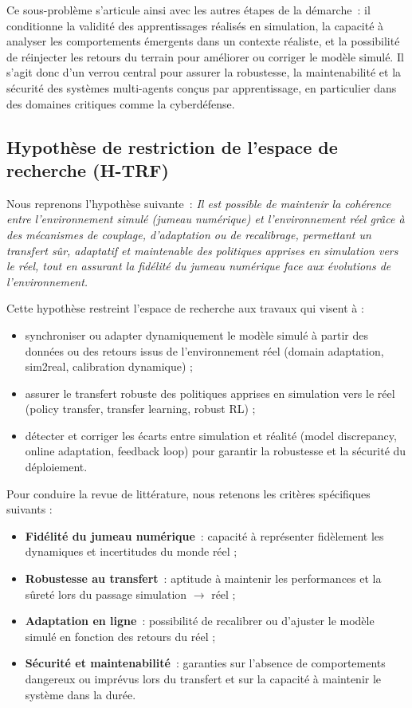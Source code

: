 Ce sous-problème s'articule ainsi avec les autres étapes de la démarche : il conditionne la validité des apprentissages réalisés en simulation, la capacité à analyser les comportements émergents dans un contexte réaliste, et la possibilité de réinjecter les retours du terrain pour améliorer ou corriger le modèle simulé. Il s'agit donc d'un verrou central pour assurer la robustesse, la maintenabilité et la sécurité des systèmes multi-agents conçus par apprentissage, en particulier dans des domaines critiques comme la cyberdéfense.

\subsection*{Hypothèse de restriction de l’espace de recherche (H-TRF)}

Nous reprenons l’hypothèse suivante~: \textit{Il est possible de maintenir la cohérence entre l’environnement simulé (jumeau numérique) et l’environnement réel grâce à des mécanismes de couplage, d’adaptation ou de recalibrage, permettant un transfert sûr, adaptatif et maintenable des politiques apprises en simulation vers le réel, tout en assurant la fidélité du jumeau numérique face aux évolutions de l’environnement.}

Cette hypothèse restreint l’espace de recherche aux travaux qui visent à :
\begin{itemize}
  \item synchroniser ou adapter dynamiquement le modèle simulé à partir des données ou des retours issus de l’environnement réel (domain adaptation, sim2real, calibration dynamique) ;
  \item assurer le transfert robuste des politiques apprises en simulation vers le réel (policy transfer, transfer learning, robust RL) ;
  \item détecter et corriger les écarts entre simulation et réalité (model discrepancy, online adaptation, feedback loop) pour garantir la robustesse et la sécurité du déploiement.
\end{itemize}

Pour conduire la revue de littérature, nous retenons les critères spécifiques suivants :
\begin{itemize}
  \item \textbf{Fidélité du jumeau numérique}~: capacité à représenter fidèlement les dynamiques et incertitudes du monde réel ;
  \item \textbf{Robustesse au transfert}~: aptitude à maintenir les performances et la sûreté lors du passage simulation $\rightarrow$ réel ;
  \item \textbf{Adaptation en ligne}~: possibilité de recalibrer ou d’ajuster le modèle simulé en fonction des retours du réel ;
  \item \textbf{Sécurité et maintenabilité}~: garanties sur l’absence de comportements dangereux ou imprévus lors du transfert et sur la capacité à maintenir le système dans la durée.
\end{itemize}

